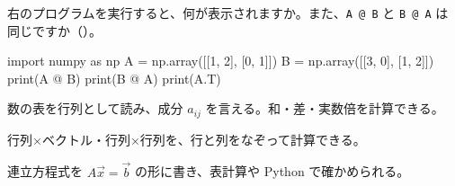 \bkproblem \begin{minipage}[t]{0.44\linewidth}\vspace{0pt}\raggedright
右のプログラムを実行すると、何が表示されますか。また、\texttt{A @ B} と \texttt{B @ A} は同じですか\mbox{（）}。
\end{minipage}\hfill
\begin{minipage}[t]{0.48\linewidth}\vspace{0pt}
\begin{bkcode}[Python]
import numpy as np
A = np.array([[1, 2],
              [0, 1]])
B = np.array([[3, 0],
              [1, 2]])
print(A @ B)
print(B @ A)
print(A.T)
\end{bkcode}
\end{minipage}

\begin{furikaeri}
\begin{checklist}
\item 数の表を行列として読み、成分 $a_{ij}$ を言える。和・差・実数倍を計算できる。
\item 行列×ベクトル・行列×行列を、行と列をなぞって計算できる。
\item 連立方程式を $A\vec x=\vec b$ の形に書き、表計算や Python で確かめられる。
\end{checklist}
\end{furikaeri}

